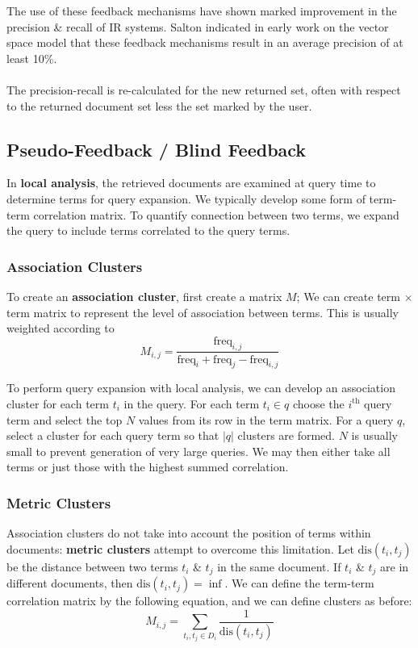 \documentclass[a4paper,11pt]{article}
\begin{document}
The use of these feedback mechanisms have shown marked improvement in the precision \& recall of IR systems.
Salton indicated in early work on the vector space model that these feedback mechanisms result in an average precision of at least 10\%.
\\\\
The precision-recall is re-calculated for the new returned set, often with respect to the returned document set less the set marked by the user.

\subsection{Pseudo-Feedback / Blind Feedback}
In \textbf{local analysis}, the retrieved documents are examined at query time to determine terms for query expansion.
We typically develop some form of term-term correlation matrix. 
To quantify connection between two terms, we expand the query to include terms correlated to the query terms.

\subsubsection{Association Clusters}
To create an \textbf{association cluster}, first create a matrix $M$;
We can create term $\times$ term matrix to represent the level of association between terms.
This is usually weighted according to
\[
    M_{i,j} = \frac{\text{freq}_{i,j}}{\text{freq}_{i} + \text{freq}_{j} - \text{freq}_{i,j}}
\]

To perform query expansion with local analysis, we can develop an association cluster for each term $t_i$ in the query.
For each term $t_i \in q$ choose the $i^\text{th}$ query term and select the top $N$ values from its row in the term matrix.
For a query $q$, select a cluster for each query term so that $\left| q \right|$ clusters are formed.
$N$ is usually small to prevent generation of very large queries.
We may then either take all terms or just those with the highest summed correlation.

\subsubsection{Metric Clusters}
Association clusters do not take into account the position of terms within documents: \textbf{metric clusters} attempt to overcome this limitation.
Let $\text{dis}(t_i, t_j)$ be the distance between two terms $t_i$ \& $t_j$ in the same document.
If $t_i$ \& $t_j$ are in different documents, then $\text{dis}(t_i, t_j) = \inf$.
We can define the term-term correlation matrix by the following equation, and we can define clusters as before:
\[
    M_{i,j} = \sum_{t_i, t_j \in D_i} \frac{1}{\text{dis}(t_i, t_j)}
\]
\end{document}
